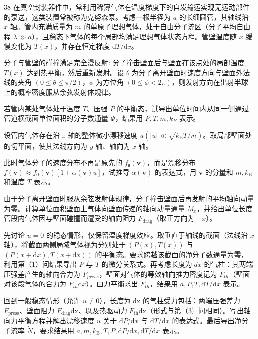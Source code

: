 \begin{problem}[2026年博知汇BWPhO][克努森泵]{38}
    在真空封装器件中，常利用稀薄气体在温度梯度下的自发输运实现无运动部件的泵送，这类装置常被称为克努森泵。考虑一根半径为 $a$ 的长细圆管，其轴线沿 $x$ 轴。管内充满质量为 $m$ 的单原子理想气体，处于自由分子流区（分子平均自由程 $\lambda \gg a$），且稳态下气体的每个局部均满足理想气体状态方程。管壁温度随 $x$ 缓慢变化为 $T(x)$，并存在恒定梯度 $\mathrm{d}T / \mathrm{d}x$。

    分子与管壁的碰撞满足完全漫反射: 分子撞击壁面后与壁面在该点处的局部温度 $T(x)$ 达到热平衡，然后重新发射。设 $\theta$ 为分子离开壁面时速度方向与壁面外法线的夹角 $(0 \leq \theta \leq \pi/2)$，$\phi$ 为方位角 $(0 \leq \phi < 2\pi)$，则发射方向在出射半球上的概率密度服从余弦发射体规律。
    \begin{subproblem}
        若管内某处气体处于温度 $T$、压强 $P$ 的平衡态，试导出单位时间内从同一侧通过管道横截面单位面积的分子数通量 $\Phi$，结果用 $P, T, m, k_{B}$ 表示。
    \end{subproblem}
    \begin{subproblem}
        设管内气体存在沿 $x$ 轴的整体微小漂移速度 $u(|u| \ll \sqrt{k_{\mathrm{B}} T/m})$。取局部壁面处的切平面，使其法线方向为 $y$ 轴、轴向为 $x$ 轴。
        \begin{subsubproblem}
            此时气体分子的速度分布不再是原先的 $f_{0}(\pmb{v})$，而是漂移分布 $f(\pmb{v}) \approx f_{0}(\pmb{v})[1 + \alpha (\pmb{v})u]$，试推导 $\alpha (\pmb{v})$ 的表达式，用 $\pmb{v}$ 的分量和 $m, k_{\mathrm{B}}$ 和温度 $T$ 表示。
        \end{subsubproblem}
        \begin{subsubproblem}
            由于分子离开壁面时服从余弦发射体规律，分子撞击壁面后再发射的平均轴向动量为零。计算单位面积壁面上气体向壁面传递的轴向动量通量 $M_{x}$，并给出单位长度管段内气体因与壁面碰撞而遭受的轴向阻力 $F_{\mathrm{drag}}$（取正方向为 $+x$）。
        \end{subsubproblem}
    \end{subproblem}
    \begin{subproblem}
        先讨论 $u=0$ 的稳态情形，仅保留温度梯度效应。取垂直于轴线的截面（法线沿 $x$ 轴），将截面两侧局域气体视为分别处于 $(P(x),T(x))$ 与 $(P(x+\mathrm{d}x),T(x+\mathrm{d}x))$ 的平衡态。要求跨越该截面的净分子数通量为零，利用第（1）问结果导出 $P$ 与 $T$ 的微分关系式。再考虑长度为 $dx$ 的气柱：其两端压强差产生的轴向合力为 $F_{press}$，壁面对气体的等效轴向推力密度记为 $F_{th}$（壁面对该段气体的合力为 $F_{th}\mathrm{d}x$）。由力平衡求出 $F_{th}$，结果用 $a, P, T, \mathrm{d}T/\mathrm{d}x$ 表示。
    \end{subproblem}
    \begin{subproblem}
        回到一般稳态情形（允许 $u \neq 0$），长度为 $\mathrm{dx}$ 的气柱受力包括：两端压强差力 $F_{\mathrm{press}}$、壁面阻力 $F_{\mathrm{drag}} \mathrm{dx}$、以及热驱动力 $F_{\mathrm{th}} \mathrm{dx}$（形式与第（3）问相同）。写出轴向力平衡方程并解出漂移速度 $u$ 关于 $\mathrm{d}P / \mathrm{d}x$ 与 $\mathrm{d}T / \mathrm{d}x$ 的表达式。最后导出净分子流率 $\dot{N}$，要求结果用 $a, m, k_{\mathrm{B}}, T, P, \mathrm{d}P / \mathrm{d}x, \mathrm{d}T / \mathrm{d}x$ 表示。
    \end{subproblem}
\end{problem}

